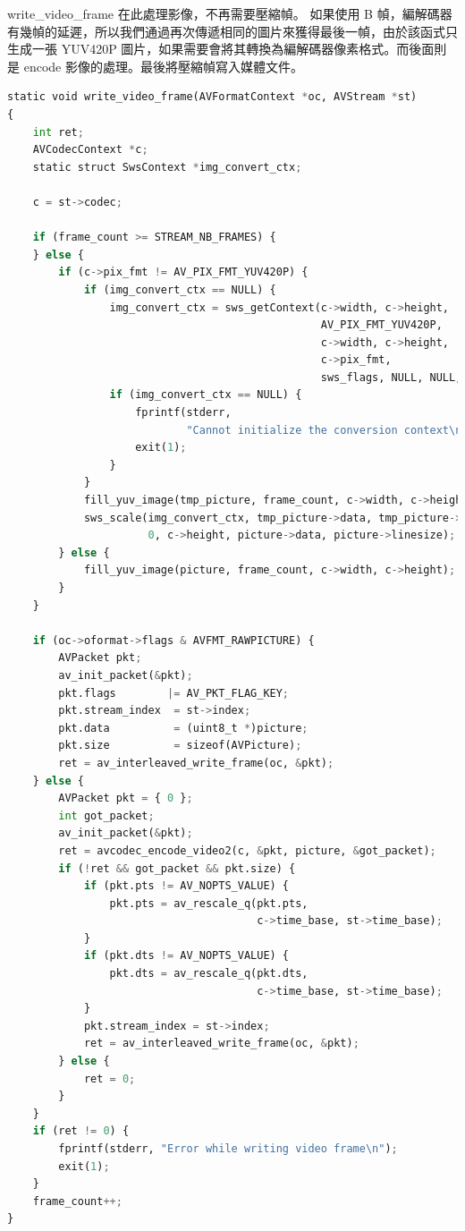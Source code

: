 \documentclass[10pt,UTF8]{ctexart}
\begin{document}
write\_video\_frame 在此處理影像，不再需要壓縮幀。 如果使用 B 幀，編解碼器有幾幀的延遲，所以我們通過再次傳遞相同的圖片來獲得最後一幀，由於該函式只生成一張 YUV420P 圖片，如果需要會將其轉換為編解碼器像素格式。而後面則是 encode 影像的處理。最後將壓縮幀寫入媒體文件。

\begin{lstlisting}[language={python}]
static void write_video_frame(AVFormatContext *oc, AVStream *st)
{
    int ret;
    AVCodecContext *c;
    static struct SwsContext *img_convert_ctx;

    c = st->codec;

    if (frame_count >= STREAM_NB_FRAMES) {
    } else {
        if (c->pix_fmt != AV_PIX_FMT_YUV420P) {
            if (img_convert_ctx == NULL) {
                img_convert_ctx = sws_getContext(c->width, c->height,
                                                 AV_PIX_FMT_YUV420P,
                                                 c->width, c->height,
                                                 c->pix_fmt,
                                                 sws_flags, NULL, NULL, NULL);
                if (img_convert_ctx == NULL) {
                    fprintf(stderr,
                            "Cannot initialize the conversion context\n");
                    exit(1);
                }
            }
            fill_yuv_image(tmp_picture, frame_count, c->width, c->height);
            sws_scale(img_convert_ctx, tmp_picture->data, tmp_picture->linesize,
                      0, c->height, picture->data, picture->linesize);
        } else {
            fill_yuv_image(picture, frame_count, c->width, c->height);
        }
    }

    if (oc->oformat->flags & AVFMT_RAWPICTURE) {
        AVPacket pkt;
        av_init_packet(&pkt);
        pkt.flags        |= AV_PKT_FLAG_KEY;
        pkt.stream_index  = st->index;
        pkt.data          = (uint8_t *)picture;
        pkt.size          = sizeof(AVPicture);
        ret = av_interleaved_write_frame(oc, &pkt);
    } else {
        AVPacket pkt = { 0 };
        int got_packet;
        av_init_packet(&pkt);
        ret = avcodec_encode_video2(c, &pkt, picture, &got_packet);
        if (!ret && got_packet && pkt.size) {
            if (pkt.pts != AV_NOPTS_VALUE) {
                pkt.pts = av_rescale_q(pkt.pts,
                                       c->time_base, st->time_base);
            }
            if (pkt.dts != AV_NOPTS_VALUE) {
                pkt.dts = av_rescale_q(pkt.dts,
                                       c->time_base, st->time_base);
            }
            pkt.stream_index = st->index;
            ret = av_interleaved_write_frame(oc, &pkt);
        } else {
            ret = 0;
        }
    }
    if (ret != 0) {
        fprintf(stderr, "Error while writing video frame\n");
        exit(1);
    }
    frame_count++;
}
\end{lstlisting}
\end{document}
